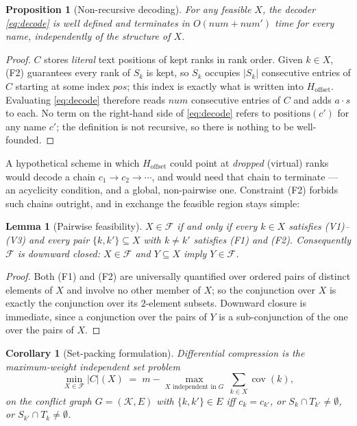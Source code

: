 \documentclass[11pt,a4paper]{article}
\theoremstyle{definition}
\theoremstyle{plain}
\newtheorem{lemma}[theorem]{Lemma}
\newtheorem{proposition}[theorem]{Proposition}
\newtheorem{corollary}[theorem]{Corollary}
\theoremstyle{remark}
\newcommand{\cov}{\operatorname{cov}}
\newcommand{\Feas}{\mathcal{F}}
\newcommand{\Links}{\mathcal{K}}
\begin{document}
\begin{proposition}[Non-recursive decoding]
\label{prop:noacyclic}
For any feasible $X$, the decoder \eqref{eq:decode} is well defined and
terminates in $O(\mathit{num}+\mathit{num}')$ time for every name,
independently of the structure of $X$.
\end{proposition}

\begin{proof}
$C$ stores \emph{literal} text positions of kept ranks in rank order.
Given $k \in X$, (F2) guarantees every rank of $S_k$ is kept, so $S_k$
occupies $|S_k|$ consecutive entries of $C$ starting at some index
$\mathit{pos}$; this index is exactly what is written into
$H_{\mathrm{offset}}$. Evaluating \eqref{eq:decode} therefore reads
$\mathit{num}$ consecutive entries of $C$ and adds $a\cdot s$ to each. No
term on the right-hand side of \eqref{eq:decode} refers to
$\text{positions}(c')$ for any name $c'$; the definition is not
recursive, so there is nothing to be well-founded.
\end{proof}

A hypothetical scheme in which $H_{\mathrm{offset}}$ could point at
\emph{dropped} (virtual) ranks would decode a chain
$c_1 \to c_2 \to \cdots$, and would need that chain to terminate --- an
acyclicity condition, and a global, non-pairwise one. Constraint (F2)
forbids such chains outright, and in exchange the feasible region stays
simple:

\begin{lemma}[Pairwise feasibility]
\label{lem:pairwise}
$X \in \Feas$ if and only if every $k \in X$ satisfies (V1)--(V3) and
every pair $\{k,k'\} \subseteq X$ with $k \ne k'$ satisfies (F1) and
(F2). Consequently $\Feas$ is downward closed: $X \in \Feas$ and
$Y \subseteq X$ imply $Y \in \Feas$.
\end{lemma}

\begin{proof}
Both (F1) and (F2) are universally quantified over ordered pairs of
distinct elements of $X$ and involve no other member of $X$; so the
conjunction over $X$ is exactly the conjunction over its $2$-element
subsets. Downward closure is immediate, since a conjunction over the
pairs of $Y$ is a sub-conjunction of the one over the pairs of $X$.
\end{proof}

\begin{corollary}[Set-packing formulation]
\label{cor:packing}
Differential compression is the maximum-weight independent set problem
\[
  \min_{X \in \Feas} |C|(X)
  \;=\;
  m - \max_{X \text{ independent in } G} \ \sum_{k \in X} \cov(k),
\]
on the conflict graph $G = (\Links, E)$ with
$\{k,k'\} \in E$ iff $c_k = c_{k'}$, or
$S_k \cap T_{k'} \ne \emptyset$, or $S_{k'} \cap T_k \ne \emptyset$.
\end{corollary}
\end{document}
